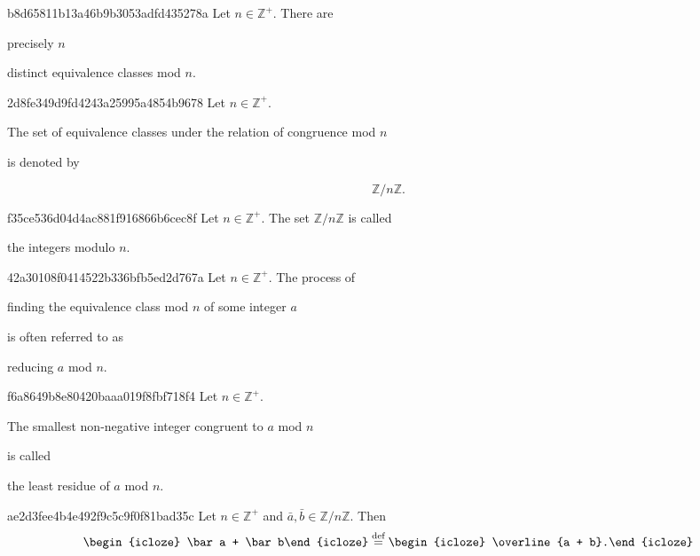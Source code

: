\begin{note}{b8d65811b13a46b9b3053adfd435278a}
    Let \({ n \in \mathbb Z^{+} }\).
    There are \begin{icloze}{1}precisely \({ n }\)\end{icloze} distinct equivalence classes mod \({ n }\).
\end{note}

\begin{note}{2d8fe349d9fd4243a25995a4854b9678}
    Let \({ n \in \mathbb Z^{+} }\).
    \begin{icloze}{1}The set of equivalence classes under the relation of congruence mod \({ n }\)\end{icloze} is denoted by
    \begin{icloze}{2}
        \[
            \mathbb Z / n\mathbb Z.
        \]
    \end{icloze}
\end{note}

\begin{note}{f35ce536d04d4ac881f916866b6cec8f}
    Let \({ n \in \mathbb Z^{+} }\).
    The set \({ \mathbb Z / n\mathbb Z }\) is called \begin{icloze}{1}the integers modulo \({ n }\).\end{icloze}
\end{note}

\begin{note}{42a30108f0414522b336bfb5ed2d767a}
    Let \({ n \in \mathbb Z^{+} }\).
    The process of \begin{icloze}{2}finding the equivalence class mod \({ n }\) of some integer \({ a }\)\end{icloze} is often referred to as \begin{icloze}{1}reducing \({ a }\) mod \({ n }\).\end{icloze}
\end{note}

\begin{note}{f6a8649b8e80420baaa019f8fbf718f4}
    Let \({ n \in \mathbb Z^{+} }\).
    \begin{icloze}{1}The smallest non-negative integer congruent to \({ a }\) mod \({ n }\)\end{icloze} is called \begin{icloze}{2}the least residue of \({ a }\) mod \({ n }\).\end{icloze}
\end{note}

\begin{note}{ae2d3fee4b4e492f9c5c9f0f81bad35c}
    Let \({ n \in \mathbb Z^{+} }\) and \({ \bar a, \bar b \in \mathbb Z / n\mathbb Z }\).
    Then
    \[
        \begin{icloze}{2}\bar a + \bar b\end{icloze} \overset{\text{def}}= \begin{icloze}{1}\overline{a + b}.\end{icloze}
    \]
\end{note}

